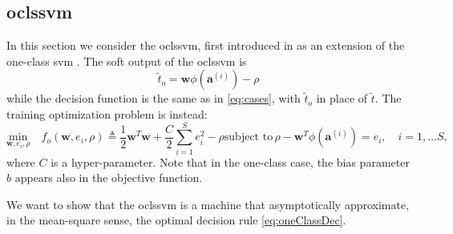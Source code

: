 \documentclass[draftcls,onecolumn,12pt]{IEEEtran}
\begin{document}
\subsection{\Acl{oclssvm}}
In this section we consider the \ac{oclssvm}, first introduced in \cite{choi2009least} as an extension of the one-class \ac{svm} \cite{Scholkopf2001estimating}. The soft output of the \ac{oclssvm} is 
\begin{equation}
	\tilde{t}_o = \mathbf{w} \phi(\mathbf{a}^{(i)}) - \rho		
\end{equation} 
while the decision function is the same as in \eqref{eq:cases}, with $\tilde{t}_o$ in place of $\tilde{t}$. The training optimization problem is instead:
\begin{subequations}
	\label{eq:oneClassSvm}
	\begin{equation}
	\label{eq:oneClass1}
	\underset{\mathbf{w},e_i, \rho}{\text{min}} \quad f_o(\mathbf{w},e_i, \rho) \triangleq
	 \frac{1}{2} \mathbf{w}^T \mathbf{w} +  \frac{C}{2} \sum_{i=1}^S e_i^2 - \rho 
	\end{equation}
	\begin{equation}
	\label{eq:oneClassConstr}
	\text{subject to}\, \rho - \mathbf{w}^T \phi (\mathbf{a}^{(i)})  = e_i,  \quad i = 1,\dots S, 
	\end{equation}
\end{subequations}
where $C$ is a hyper-parameter.
Note that in the one-class case, the bias parameter $b$ appears also in the objective function.

We want to show that the \ac{oclssvm} is a machine that asymptotically approximate, in the mean-square sense, the optimal decision rule \eqref{eq:oneClassDec}.
\end{document}
